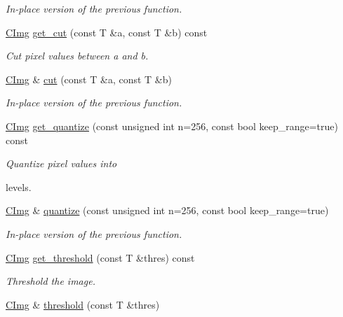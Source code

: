 \begin{DoxyCompactItemize}
\begin{DoxyCompactList}\small\item\em In-\/place version of the previous function. \end{DoxyCompactList}\item 
\hyperlink{structcimg__library_1_1_c_img}{C\-Img} \hyperlink{structcimg__library_1_1_c_img_ae92404d5e23f0ace476fb541f913dd19}{get\-\_\-cut} (const T \&a, const T \&b) const 
\begin{DoxyCompactList}\small\item\em Cut pixel values between {\itshape a} and {\itshape b}. \end{DoxyCompactList}\item 
\hypertarget{structcimg__library_1_1_c_img_ad74dbbcaf96762284bbf67e2e2ad1a64}{\hyperlink{structcimg__library_1_1_c_img}{C\-Img} \& \hyperlink{structcimg__library_1_1_c_img_ad74dbbcaf96762284bbf67e2e2ad1a64}{cut} (const T \&a, const T \&b)}\label{structcimg__library_1_1_c_img_ad74dbbcaf96762284bbf67e2e2ad1a64}

\begin{DoxyCompactList}\small\item\em In-\/place version of the previous function. \end{DoxyCompactList}\item 
\hyperlink{structcimg__library_1_1_c_img}{C\-Img} \hyperlink{structcimg__library_1_1_c_img_ac4f1d67f82116766a0855f1cb2cd5878}{get\-\_\-quantize} (const unsigned int n=256, const bool keep\-\_\-range=true) const 
\begin{DoxyCompactList}\small\item\em Quantize pixel values into \par
 levels. \end{DoxyCompactList}\item 
\hypertarget{structcimg__library_1_1_c_img_a7baf94a72db832d96cb8186b8898b0e2}{\hyperlink{structcimg__library_1_1_c_img}{C\-Img} \& \hyperlink{structcimg__library_1_1_c_img_a7baf94a72db832d96cb8186b8898b0e2}{quantize} (const unsigned int n=256, const bool keep\-\_\-range=true)}\label{structcimg__library_1_1_c_img_a7baf94a72db832d96cb8186b8898b0e2}

\begin{DoxyCompactList}\small\item\em In-\/place version of the previous function. \end{DoxyCompactList}\item 
\hyperlink{structcimg__library_1_1_c_img}{C\-Img} \hyperlink{structcimg__library_1_1_c_img_a80cd02a15494653e88c9c91e02dfebca}{get\-\_\-threshold} (const T \&thres) const 
\begin{DoxyCompactList}\small\item\em Threshold the image. \end{DoxyCompactList}\item 
\hypertarget{structcimg__library_1_1_c_img_ae98d5f595dd43b98a38fda8ee279d469}{\hyperlink{structcimg__library_1_1_c_img}{C\-Img} \& \hyperlink{structcimg__library_1_1_c_img_ae98d5f595dd43b98a38fda8ee279d469}{threshold} (const T \&thres)}\label{structcimg__library_1_1_c_img_ae98d5f595dd43b98a38fda8ee279d469}


\end{DoxyCompactItemize}
